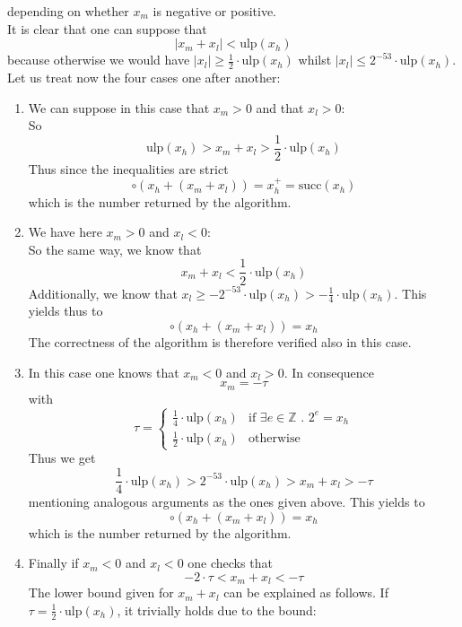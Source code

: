\documentclass[a4paper,10pt,twoside]{article}
\newenvironment{proof}[1][Proof]{\begin{trivlist}
\item[\hskip \labelsep {\bfseries #1}]}{\end{trivlist}}
\newcommand{\Z}{\ensuremath{\mathbb {Z}}}
\newcommand{\hi}{\ensuremath{\mathit{h}}}
\newcommand{\mi}{\ensuremath{\mathit{m}}}
\newcommand{\lo}{\ensuremath{\mathit{l}}}
\newcommand{\mUlp}{\ensuremath{\mathrm{ulp}}}
\renewcommand{\succ}{\ensuremath{\mathrm{succ}}}
\begin{document}
\begin{proof}
depending on whether $x_\mi$ is negative or positive.\\
It is clear that one can suppose that
$$\left \vert x_\mi + x_\lo \right \vert < \mUlp\left( x_\hi \right)$$
because otherwise we would have $\left \vert x_\lo \right \vert \geq \frac{1}{2} \cdot \mUlp\left( x_\hi \right)$ whilst
$\left \vert x_\lo \right \vert \leq 2^{-53} \cdot \mUlp\left( x_\hi \right)$.\\
Let us treat now the four cases one after another:
{
\renewcommand{\labelenumi}{\alph{enumi}.)}
\begin{enumerate}
\item We can suppose in this case that $x_\mi > 0$ and that $x_\lo > 0$: \\
So
$$\mUlp\left( x_\hi \right) > x_\mi + x_\lo > \frac{1}{2} \cdot \mUlp\left(x_\hi \right)$$
Thus since the inequalities are strict
$$\circ \left( x_\hi + \left( x_\mi + x_\lo \right) \right) = x_\hi^+ = \succ\left( x_\hi \right)$$
which is the number returned by the algorithm.
\item We have here $x_\mi > 0$ and $x_\lo < 0$: \\
So the same way, we know that
$$x_\mi + x_\lo < \frac{1}{2} \cdot \mUlp\left(x_\hi \right)$$
Additionally, we know that $x_\lo \geq -2^{-53} \cdot \mUlp\left(x_\hi \right) > -\frac{1}{4} \cdot \mUlp\left( x_\hi \right)$.
This yields thus to
$$\circ \left( x_\hi + \left( x_\mi + x_\lo \right) \right) = x_\hi$$
The correctness of the algorithm is therefore verified also in this case.
\item In this case one knows that $x_\mi < 0$ and $x_\lo > 0$. In consequence
$$x_\mi = - \tau$$
with $$\tau = \left \lbrace \begin{array}{ll}
\frac{1}{4} \cdot \mUlp\left(x_\hi \right) & \mbox{if } \exists e \in \Z \mbox{ . } 2^e = x_\hi \\
\frac{1}{2} \cdot \mUlp\left(x_\hi \right) & \mbox{otherwise} \end{array} \right.$$
Thus we get
$$\frac{1}{4} \cdot \mUlp\left( x_\hi \right) > 2^{-53} \cdot \mUlp \left( x_\hi \right) > x_\mi + x_\lo > -\tau$$
mentioning analogous arguments as the ones given above. This yields to
$$\circ \left( x_\hi + \left( x_\mi + x_\lo \right) \right) = x_\hi$$
which is the number returned by the algorithm.
\item Finally if $x_\mi < 0$ and $x_\lo < 0$ one checks that
$$-2 \cdot \tau < x_\mi + x_\lo < -\tau$$
The lower bound given for $x_\mi + x_\lo$ can be explained as follows.
If $\tau = \frac{1}{2} \cdot \mUlp\left( x_\hi \right)$, it trivially holds due to the bound:

\end{enumerate}}
\end{proof}
\end{document}
